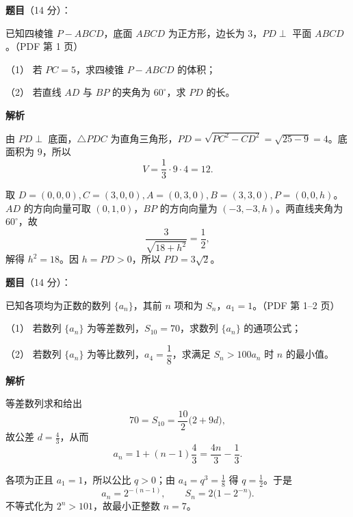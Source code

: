 \begin{answer}

\textbf{题目}（14 分）：

已知四棱锥 $P-ABCD$，底面 $ABCD$ 为正方形，边长为 $3$，$PD\perp$ 平面 $ABCD$。（PDF 第 1 页）

（1） 若 $PC=5$，求四棱锥 $P-ABCD$ 的体积；

（2） 若直线 $AD$ 与 $BP$ 的夹角为 $60^\circ$，求 $PD$ 的长。
\nopagebreak[4]
\begin{center}\end{center}
\nopagebreak[4]
\textbf{解析}


由 $PD\perp$ 底面，$\triangle PDC$ 为直角三角形，$PD=\sqrt{PC^2-CD^2}=\sqrt{25-9}=4$。底面积为 $9$，所以
\nopagebreak[4]
\[
V=\frac13\cdot9\cdot4=12.
\]


取 $D=(0,0,0),C=(3,0,0),A=(0,3,0),B=(3,3,0),P=(0,0,h)$。$AD$ 的方向向量可取 $(0,1,0)$，$BP$ 的方向向量为 $(-3,-3,h)$。两直线夹角为 $60^\circ$，故
\nopagebreak[4]
\[
\frac{3}{\sqrt{18+h^2}}=\frac12,
\]
解得 $h^2=18$。因 $h=PD>0$，所以 $PD=3\sqrt2$。



\end{answer}
\begin{answer}

\textbf{题目}（14 分）：

已知各项均为正数的数列 $\{a_n\}$，其前 $n$ 项和为 $S_n$，$a_1=1$。（PDF 第 1–2 页）

（1） 若数列 $\{a_n\}$ 为等差数列，$S_{10}=70$，求数列 $\{a_n\}$ 的通项公式；

（2） 若数列 $\{a_n\}$ 为等比数列，$a_4=\dfrac18$，求满足 $S_n>100a_n$ 时 $n$ 的最小值。

\textbf{解析}


等差数列求和给出
\nopagebreak[4]
\[
70=S_{10}=\frac{10}{2}\bigl(2+9d\bigr),
\]
故公差 $d=\frac43$，从而
\nopagebreak[4]
\[
a_n=1+(n-1)\frac43=\frac{4n}{3}-\frac13.
\]


各项为正且 $a_1=1$，所以公比 $q>0$；由 $a_4=q^3=\frac18$ 得 $q=\frac12$。于是
\nopagebreak[4]
\[
a_n=2^{-(n-1)},\qquad S_n=2\bigl(1-2^{-n}\bigr).
\]
不等式化为 $2^n>101$，故最小正整数 $n=7$。



\end{answer}
